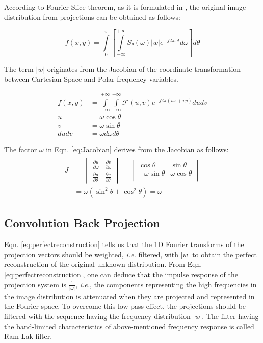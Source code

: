 \documentclass[journal]{IEEEtran}
\begin{document}
According to Fourier Slice theorem, as it is formulated in \cite{kak2001principles}, the original image distribution from projections can be obtained as follows:

\begin{equation}
	f(x,y) = \int\limits_0^\pi\left[\int\limits_{-\infty}^{+\infty}S_{\theta}(\omega)|w|e^{-j2\pi{\omega}t}d\omega\right]d\theta
	\label{eq:perfectreconstruction}
\end{equation}

The term $|w|$ originates from the Jacobian of the coordinate transformation between Cartesian Space and Polar frequency variables. 

\begin{align}
	f(x,y) &= \int\limits_{-\infty}^{+\infty}\int\limits_{-\infty}^{+\infty}\mathcal{F}(u,v)e^{-j2\pi{(ux+vy)}}du{dv} \label{eq:2DFFT} \\
	u &= \omega\cos\theta \\
	v &= \omega\sin\theta \\
	du dv &= \omega d\omega d\theta \label{eq:Jacobian}
\end{align}

The factor $\omega$ in Eqn. \ref{eq:Jacobian} derives from the Jacobian as follows:
\begin{gather}
	\begin{align}
	J &= \begin{vmatrix}
		\frac{\partial u}{\partial \omega} & \frac{\partial v}{\partial \omega} \\ 
		\frac{\partial u}{\partial \theta} & \frac{\partial v}{\partial \theta} 
	\end{vmatrix} = \begin{vmatrix}
		\cos\theta & \sin\theta \\ 
		-\omega\sin\theta & \omega\cos\theta \\
	\end{vmatrix} \\
	&= \omega(\sin^2\theta + \cos^2\theta) = \omega
	\end{align}
\end{gather}

\subsection{Convolution Back Projection} \label{subsec:convback}
Eqn. \ref{eq:perfectreconstruction} tells us that the 1D Fourier transforms of the projection vectors should be weighted, \textit{i.e.} filtered, with $|w|$ to obtain the perfect reconstruction of the original unknown distribution. From Eqn. \ref{eq:perfectreconstruction}, one can deduce that the impulse response of the projection system is $\frac{1}{|\omega|}$, \textit{i.e.}, the components representing the high frequencies in the image distribution is attenuated when they are projected and represented in the Fourier space. 
\vfill{\null}
To overcome this low-pass effect, the projections should be filtered with the sequence having the frequency distribution $|w|$. The filter having the band-limited characteristics of above-mentioned frequency response is called Ram-Lak filter.
\end{document}
